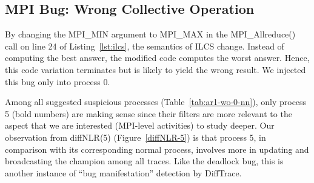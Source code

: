 





\subsection{MPI Bug: Wrong Collective Operation}

By changing the MPI\_MIN argument to MPI\_MAX in the MPI\_Allreduce() call on line 24 of Listing~\ref{lst:ilcs}, the semantics of ILCS change. 
%
Instead of computing the best answer, the modified code computes the worst answer.
%
Hence, this code variation terminates but is likely to yield the wrong result.
%
We injected this bug only into process 0.

Among all suggested suspicious processes (Table~\ref{tab:ar1-wo-0-nn}), only process 5 (bold numbers) are making sense since their filters are more relevant to the aspect that we are interested (MPI-level activities) to study deeper.
%
Our observation from diffNLR(5) (Figure~\ref{diffNLR-5}) is that process 5, in comparison with its corresponding normal process, involves more in updating and broadcasting the champion among all traces.
%
Like the deadlock bug, this is another instance of ``bug manifestation'' detection by DiffTrace.






